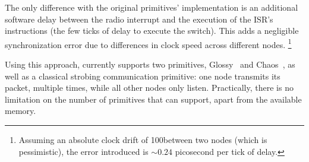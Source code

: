 The only difference with the original primitives' implementation is an additional software delay between the radio interrupt and the execution of the ISR's instructions (the few ticks of delay to execute the switch).
This adds a negligible synchronization error due to differences in clock speed across different nodes.%
\footnote{%
	Assuming an absolute clock drift of 100\ppm between two nodes (which is pessimistic), the error introduced is $\sim 0.24$ picosecond per tick of delay.
	}

Using this approach, \baloo currently supports two \ST primitives, Glossy~\cite{ferrari2011Glossy} and Chaos~\cite{landsiedel2013Chaos}, as well as a classical strobing communication primitive: one node transmits its packet, multiple times, while all other nodes only listen.
Practically, there is no limitation on the number of primitives that \baloo can support, apart from the available memory.
